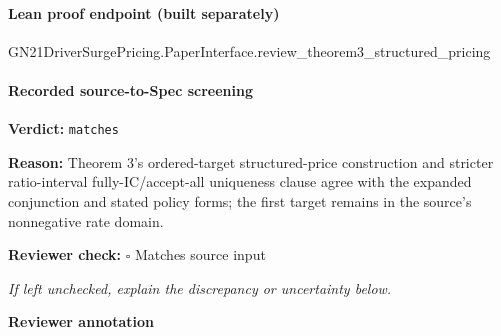 \documentclass[10pt]{article}
\newcommand{\reviewerbox}{%
  \par\noindent\fbox{\parbox{0.96\linewidth}{\rule{0pt}{0.38in}}}\par
}
\newcommand{\reviewmatch}[1]{%
  \par\noindent\textbf{Reviewer check:} $\square$\; #1\par
  \noindent\emph{If left unchecked, explain the discrepancy or uncertainty below.}\par
}
\begin{document}
\paragraph{Lean proof endpoint (built separately)}\begin{ReviewVerbatim}
GN21DriverSurgePricing.PaperInterface.review_theorem3_structured_pricing
\end{ReviewVerbatim}

\paragraph{Recorded source-to-Spec screening}
\textbf{Verdict:} \texttt{matches}
\\
{\raggedright
\textbf{Reason:} Theorem 3's ordered-\allowbreak{}target structured-\allowbreak{}price construction and stricter ratio-\allowbreak{}interval fully-\allowbreak{}IC/\allowbreak{}accept-\allowbreak{}all uniqueness clause agree with the expanded conjunction and stated policy forms;\allowbreak{} the first target remains in the source's nonnegative rate domain.\allowbreak{}
\par}
\reviewmatch{Matches source input}
\noindent\textbf{Reviewer annotation}\par
\reviewerbox
\end{document}
